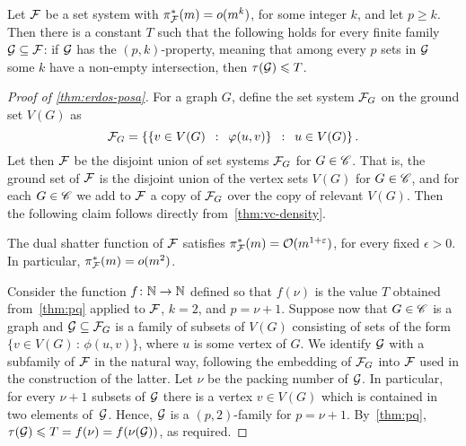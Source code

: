 \begin{theorem}\label{thm:pq}
	Let $\cal F$ be a set system with $\pi^*_{\cal F}(m)=o(m^k)$,
	for some integer $k$, and let $p\ge k$.
	Then there is a constant $T$ such that the following holds for every finite family $\cal G\subset \cal F$: 
	if $\cal G$ has the $(p,k)$-property, meaning that 
	among every $p$ sets in $\cal G$ some $k$ have a non-empty intersection, then $\tau ({\cal G})\le T$.
\end{theorem}
\begin{proof}[Proof of \autoref{thm:erdos-posa}]
For a graph $G$, define the set system ${\cal F}_G$ on the ground set $V(G)$ as
$${\cal F}_G = \setof{\setof{v\in V(G)}{\phi(u, v)}}{u\in V(G)}.$$
Let then $\cal F$ be the disjoint union of set systems ${\cal F}_G$ for $G\in \CCC$. That is, 
the ground set of $\cal F$ is the disjoint union of the vertex sets $V(G)$ for $G\in \CCC$, and for each $G\in \CCC$ we add to ${\cal F}$
a copy of ${\cal F}_G$ over the copy of relevant $V(G)$.
Then the following claim follows directly from~\autoref{thm:vc-density}.

\begin{claim}
The dual shatter function of $\cal F$ satisfies $\pi^*_{\cal F}(m)=\Oof(m^{1+\epsilon})$,
for every fixed $\epsilon>0$. In particular, $\pi^*_{\cal F}(m)=o(m^{2})$.
\end{claim}

Consider the function $f\from \N \to \N$ defined so that $f(\nu)$ is the value $T$ obtained from~\autoref{thm:pq} applied to $\cal F$, $k=2$, and $p=\nu+1$.
Suppose now that $G\in \CCC$ is a graph and $\GGG\subseteq \FFF_G$
is a family of subsets of $V(G)$ consisting of sets of the form $\{v\in V(G)\,\colon\,\phi(u,v)\}$, where $u$ is some vertex of $G$.
We identify $\GGG$ with a subfamily of $\FFF$ in the natural way, following the embedding of $\FFF_G$ into $\FFF$ used in the construction of the latter.
Let $\nu$ be the packing number of $\GGG$.
In particular, for every $\nu+1$ subsets of $\GGG$
there is a vertex $v\in V(G)$
which is contained in two elements of~$\GGG$.
Hence, $\GGG$ is a $(p,2)$-family for $p=\nu+1$.
By~\autoref{thm:pq}, $\tau(\GGG)\le T=f(\nu)=f(\nu(\GGG))$, as required.
\end{proof}
